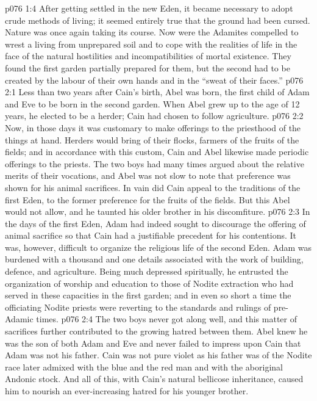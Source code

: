 \vs p076 1:4 \pc After getting settled in the new Eden, it became necessary to adopt crude methods of living; it seemed entirely true that the ground had been cursed. Nature was once again taking its course. Now were the Adamites compelled to wrest a living from unprepared soil and to cope with the realities of life in the face of the natural hostilities and incompatibilities of mortal existence. They found the first garden partially prepared for them, but the second had to be created by the labour of their own hands and in the “sweat of their faces.”
\vs p076 2:1 Less than two years after Cain’s birth, Abel was born, the first child of Adam and Eve to be born in the second garden. When Abel grew up to the age of 12 years, he elected to be a herder; Cain had chosen to follow agriculture.
\vs p076 2:2 Now, in those days it was customary to make offerings to the priesthood of the things at hand. Herders would bring of their flocks, farmers of the fruits of the fields; and in accordance with this custom, Cain and Abel likewise made periodic offerings to the priests. The two boys had many times argued about the relative merits of their vocations, and Abel was not slow to note that preference was shown for his animal sacrifices. In vain did Cain appeal to the traditions of the first Eden, to the former preference for the fruits of the fields. But this Abel would not allow, and he taunted his older brother in his discomfiture.
\vs p076 2:3 In the days of the first Eden, Adam had indeed sought to discourage the offering of animal sacrifice so that Cain had a justifiable precedent for his contentions. It was, however, difficult to organize the religious life of the second Eden. Adam was burdened with a thousand and one details associated with the work of building, defence, and agriculture. Being much depressed spiritually, he entrusted the organization of worship and education to those of Nodite extraction who had served in these capacities in the first garden; and in even so short a time the officiating Nodite priests were reverting to the standards and rulings of pre\hyp{}Adamic times.
\vs p076 2:4 The two boys never got along well, and this matter of sacrifices further contributed to the growing hatred between them. Abel knew he was the son of both Adam and Eve and never failed to impress upon Cain that Adam was not his father. Cain was not pure violet as his father was of the Nodite race later admixed with the blue and the red man and with the aboriginal Andonic stock. And all of this, with Cain’s natural bellicose inheritance, caused him to nourish an ever\hyp{}increasing hatred for his younger brother.
